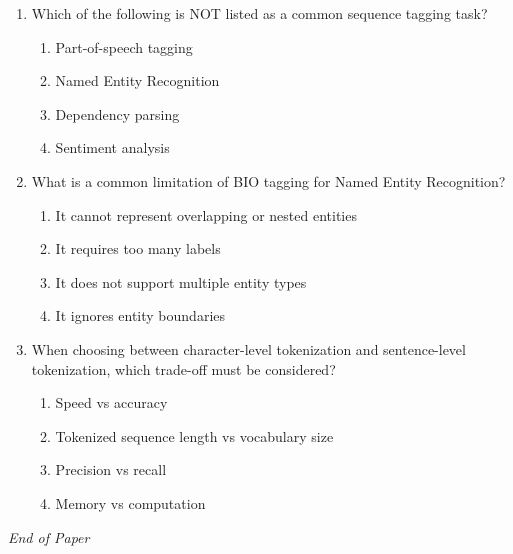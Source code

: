 \documentclass[12pt]{article}
\begin{document}
\begin{enumerate}[label=Q\arabic*.]
\begin{enumerate}[label=(\Alph*)]
\end{enumerate}
\item Which of the following is NOT listed as a common sequence tagging task?
\begin{enumerate}[label=(\Alph*)]
    \item Part-of-speech tagging
    \item Named Entity Recognition
    \item Dependency parsing
    \item Sentiment analysis
\end{enumerate}
\item What is a common limitation of BIO tagging for Named Entity Recognition?
\begin{enumerate}[label=(\Alph*)]
    \item It cannot represent overlapping or nested entities
    \item It requires too many labels
    \item It does not support multiple entity types
    \item It ignores entity boundaries
\end{enumerate}
\item When choosing between character-level tokenization and sentence-level tokenization, which trade-off must be considered?
\begin{enumerate}[label=(\Alph*)]
    \item Speed vs accuracy
    \item Tokenized sequence length vs vocabulary size
    \item Precision vs recall
    \item Memory vs computation
\end{enumerate}
\end{enumerate}

\vfill
\noindent\textit{End of Paper}
\end{document}

